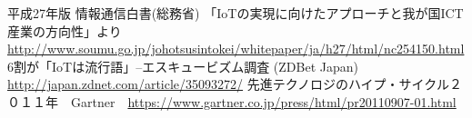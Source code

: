 \begin{thebibliography}{99}
 平成27年版 情報通信白書(総務省) 「IoTの実現に向けたアプローチと我が国ICT産業の方向性」より \url{http://www.soumu.go.jp/johotsusintokei/whitepaper/ja/h27/html/nc254150.html}
 6割が「IoTは流行語」--エスキュービズム調査 (ZDBet Japan) \url{http://japan.zdnet.com/article/35093272/}
 先進テクノロジのハイプ・サイクル２０１１年　Gartner　\url{https://www.gartner.co.jp/press/html/pr20110907-01.html}
\end{thebibliography}
